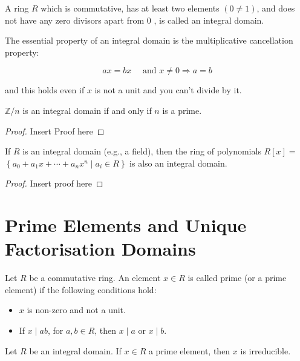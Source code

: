 \begin{definition}
A ring \(R\) which is commutative, has at least two elements \((0 \neq 1)\), and does not have any zero divisors apart from 0 , is called an integral domain.

The essential property of an integral domain is the multiplicative cancellation property:

\[
a x=b x \quad \text { and } x \neq 0 \Longrightarrow a=b
\]

and this holds even if \(x\) is not a unit and you can't divide by it.
\end{definition}

\begin{lemma}
  \(\mathbb{Z} / n\) is an integral domain if and only if \(n\) is a prime.
\end{lemma}

\begin{proof}
  Insert Proof here
\end{proof}

\begin{proposition}
  If \(R\) is an integral domain (e.g., a field), then the ring of polynomials \(R[x]=\) \(\left\{a_0+a_1 x+\cdots+a_n x^n \mid a_i \in R\right\}\) is also an integral domain.
\end{proposition}

\begin{proof}
  Insert proof here
\end{proof}

\section{Prime Elements and Unique Factorisation Domains}

\begin{definition}
  Let \(R\) be a commutative ring. An element \(x \in R\) is called prime (or a prime element) if the following conditions hold:
\begin{itemize}
\item[i)] \(x\) is non-zero and not a unit.
\item[ii)] If \(x \mid a b\), for \(a, b \in R\), then \(x \mid a\) or \(x \mid b\).
\end{itemize}
\end{definition}

\begin{lemma}
  Let \(R\) be an integral domain. If \(x \in R\) a prime element, then \(x\) is irreducible.
\end{lemma}

